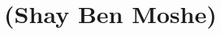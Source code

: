 \renewcommand{\thespeaker}{Shay Ben Moshe}
\renewcommand{\thetitle}{}
\section{\thetitle~(\thespeaker)}


